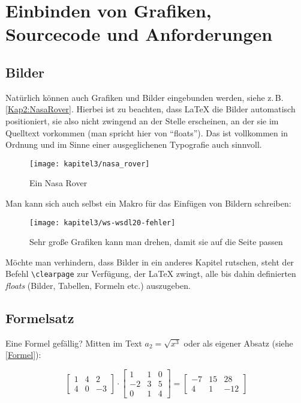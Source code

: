 \chapter{Einbinden von Grafiken, Sourcecode und Anforderungen}
\label{Kap3}

\section{Bilder}

Natürlich können auch Grafiken und Bilder eingebunden werden, siehe z.\,B. \autoref{Kap2:NasaRover}. Hierbei ist zu beachten, dass \LaTeX{} die Bilder automatisch positioniert, sie also nicht zwingend an der Stelle erscheinen, an der sie im Quelltext vorkommen (man spricht hier von \enquote{floats}). Das ist vollkommen in Ordnung und im Sinne einer ausgeglichenen Typografie auch sinnvoll.

\begin{figure}[ht]
  \centering
  \texttt{[image: kapitel3/nasa\_rover]}
  \caption{Ein Nasa Rover}
  \label{Kap2:NasaRover}
\end{figure}

Man kann sich auch selbst ein Makro für das Einfügen von Bildern schreiben:


\begin{sidewaysfigure}
 \texttt{[image: kapitel3/ws-wsdl20-fehler]}
  \caption{Sehr große Grafiken kann man drehen, damit sie auf die Seite passen}
  \label{Kap2:wsdl-fehler}
\end{sidewaysfigure}

Möchte man verhindern, dass Bilder in ein anderes Kapitel rutschen, steht der Befehl \verb+\clearpage+ zur Verfügung, der \LaTeX{} zwingt, alle bis dahin definierten \textit{floats} (Bilder, Tabellen, Formeln etc.) auszugeben.

\clearpage %


\section{Formelsatz}

Eine Formel gefällig? Mitten im Text $a_2 = \sqrt{x^3}$ oder als eigener Absatz (siehe \autoref{Formel}):

\begin{equation}
\begin{bmatrix}
   1 &  4 &  2 \\
   4 &  0 & -3
\end{bmatrix}
        \cdot
\begin{bmatrix}
   1 &  1 &  0 \\
  -2 &  3 &  5 \\
   0 &  1 &  4
\end{bmatrix}
       {=}
\begin{bmatrix}
  -7 &  15 &  28 \\
   4 &   1 & -12
\end{bmatrix}
\label{Formel}
\end{equation}

